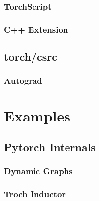      \subsubsection*{TorchScript}\label{subsec:torchscript}
      \subsubsection*{C++ Extension}\label{subsec:c++_extension}

  \subsection*{torch/csrc}
      
      \subsubsection{Autograd}\label{subsubsec:autograd}
        






\newpage
\section{Examples}
  \subsection{Pytorch Internals}\label{subsec:pytorch_internals}
  
  
  
  \subsubsection{Dynamic Graphs}\label{subsubsec:dynamic_graphs}
    
  \subsubsection{Troch Inductor}\label{subsubsec:dynamic_graphs}
    





